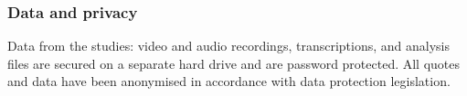 \subsubsection{Data and privacy}\label{sec: polaris-ethics-data}
Data from the studies: video and audio recordings, transcriptions, and analysis files are secured on a separate hard drive and are password protected. All quotes and data have been anonymised in accordance with data protection legislation.

